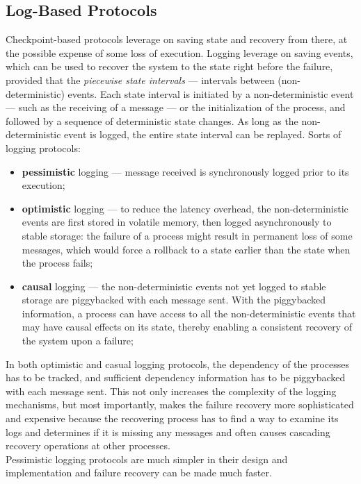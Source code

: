 \documentclass[11pt, a4paper]{article}
\begin{document}
\subsection{Log-Based Protocols}\label{sub:log_based_protocols} %
Checkpoint-based protocols leverage on saving state and recovery from there, at the possible expense of some loss of execution.
Logging leverage on saving events, which can be used to recover the system to the state right before the failure, provided that the \textit{piecewise state intervals} --- intervals between (non-deterministic) events.
Each state interval is initiated by a non-deterministic event --- such as the receiving of a message --- or the initialization of the process, and followed by a sequence of deterministic state changes.
As long as the non-deterministic event is logged, the entire state interval can be replayed.
Sorts of logging protocols:
\begin{itemize}
    \item \textbf{pessimistic} logging --- message received is synchronously logged prior to its execution;
    \item \textbf{optimistic} logging --- to reduce the latency overhead, the non-deterministic events are first stored in volatile memory, then logged asynchronously to stable storage: the failure of a process might result in permanent loss of some messages, which would force a rollback to a state earlier than the state when the process fails;
    \item \textbf{causal} logging --- the non-deterministic events not yet logged to stable storage are piggybacked with each message sent. With the piggybacked information, a process can have access to all the non-deterministic events that may have causal effects on its state, thereby enabling a consistent recovery of the system upon a failure;
\end{itemize}
In both optimistic and casual logging protocols, the dependency of the processes has to be tracked, and sufficient dependency information has to be piggybacked with each message sent.
This not only increases the complexity of the logging mechanisms, but most importantly, makes the failure recovery more sophisticated and expensive because the recovering process has to find a way to examine its logs and determines if it is missing any messages and often causes cascading recovery operations at other processes.
\\
Pessimistic logging protocols are much simpler in their design and implementation and failure recovery can be made much faster.
\end{document}
